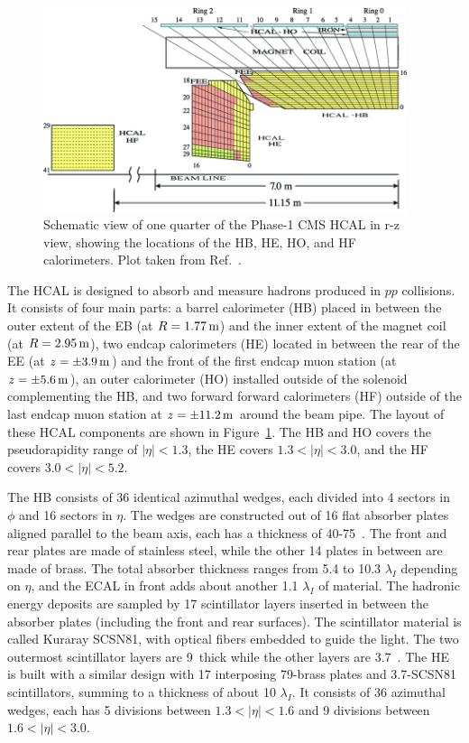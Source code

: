 \begin{figure}[!htb]
    \centering
    \captionsetup{justification=justified}
    \includegraphics[width=0.95\textwidth]{pics/LHC_CMS/HCAL.png}
    \caption{Schematic view of one quarter of the Phase-1 CMS HCAL in r-z view,
             showing the locations of the HB, HE, HO, and HF calorimeters.
             Plot taken from Ref.~\cite{Mans:1481837}.}
    \label{fig:cms_hcal}
\end{figure}

The HCAL is designed to absorb and measure hadrons produced in $pp$ collisions.
It consists of four main parts: a barrel calorimeter (HB) placed in between the outer extent of the EB (at $R = 1.77 \meter$) and the inner extent of the magnet coil (at $R = 2.95 \meter$),
two endcap calorimeters (HE) located in between the rear of the EE (at $z = \pm 3.9 \meter$) and the front of the first endcap muon station (at $z = \pm 5.6 \meter$),
an outer calorimeter (HO) installed outside of the solenoid complementing the HB,
and two forward forward calorimeters (HF) outside of the last endcap muon station at $z = \pm 11.2 \meter$ around the beam pipe.
The layout of these HCAL components are shown in Figure~\ref{fig:cms_hcal}.
The HB and HO covers the pseudorapidity range of $|\eta| < 1.3$, the HE covers $1.3 < |\eta| < 3.0$,
and the HF covers $3.0 < |\eta| < 5.2$.

The HB consists of 36 identical azimuthal wedges, each divided into 4 sectors in $\phi$ and 16 sectors in $\eta$.
The wedges are constructed out of 16 flat absorber plates aligned parallel to the beam axis, each has a thickness of 40-75~\mm.
The front and rear plates are made of stainless steel, while the other 14 plates in between are made of brass.
The total absorber thickness ranges from 5.4 to 10.3 $\lambda_{I}$ depending on $\eta$, and the ECAL in front adds about another 1.1 $\lambda_{I}$ of material.
The hadronic energy deposits are sampled by 17 scintillator layers inserted in between the absorber plates (including the front and rear surfaces).
The scintillator material is called Kuraray SCSN81, with optical fibers embedded to guide the light.
The two outermost scintillator layers are 9~\mm thick while the other layers are 3.7~\mm.
The HE is built with a similar design with 17 interposing 79-\mm brass plates and 3.7-\mm SCSN81 scintillators, summing to a thickness of about 10 $\lambda_{I}$.
It consists of 36 azimuthal wedges, each has 5 divisions between $1.3 < |\eta| < 1.6$ and 9 divisions between $1.6 < |\eta| < 3.0$.

